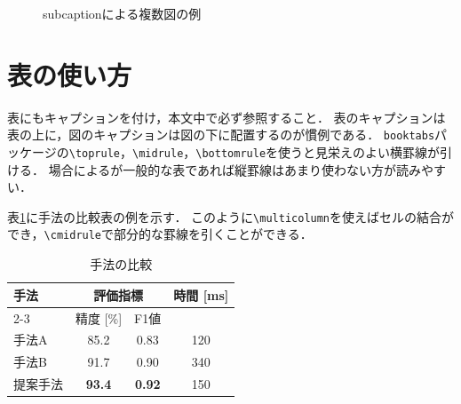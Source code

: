 \begin{figure}[tb]
    \centering
    \begin{subfigure}[b]{0.3\columnwidth}
        \centering
        \label{fig:sub-a}
    \end{subfigure}
    \hfill
    \begin{subfigure}[b]{0.3\columnwidth}
        \centering
        \label{fig:sub-b}
    \end{subfigure}
    \hfill
    \begin{subfigure}[b]{0.3\columnwidth}
        \centering
        \label{fig:sub-c}
    \end{subfigure}
    \caption{subcaptionによる複数図の例}
    \label{fig:subfigures}
\end{figure}

\section{表の使い方}
\label{sec:table}

表にもキャプションを付け，本文中で必ず参照すること．
表のキャプションは表の上に，図のキャプションは図の下に配置するのが慣例である．
\texttt{booktabs}パッケージの\verb|\toprule|，\verb|\midrule|，\verb|\bottomrule|を使うと見栄えのよい横罫線が引ける．
場合によるが一般的な表であれば縦罫線はあまり使わない方が読みやすい．

表\ref{tab:comparison}に手法の比較表の例を示す．
このように\verb|\multicolumn|を使えばセルの結合ができ，\verb|\cmidrule|で部分的な罫線を引くことができる．

\begin{table}[tb]
    \centering
    \caption{手法の比較}
    \label{tab:comparison}
    \begin{tabular}{lccc}\toprule
        \multirow{2}{*}{手法} & \multicolumn{2}{c}{評価指標} & \multirow{2}{*}{時間 [ms]} \\
        \cmidrule(lr){2-3}
                    & 精度 [\%] & F1値  &       \\ \midrule
        手法A        & 85.2     & 0.83 & 120   \\
        手法B        & 91.7     & 0.90 & 340   \\
        提案手法      & \textbf{93.4} & \textbf{0.92} & 150 \\ \bottomrule
    \end{tabular}
\end{table}

